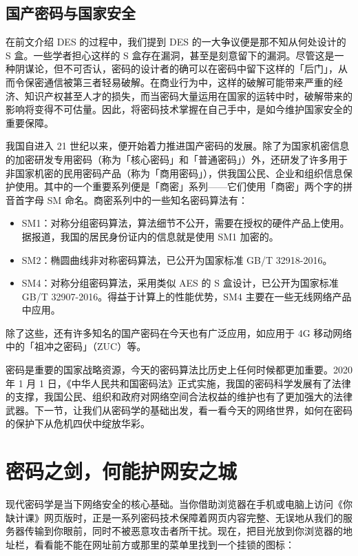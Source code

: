 \subsection{国产密码与国家安全}

在前文介绍 DES 的过程中，我们提到 DES 的一大争议便是那不知从何处设计的 S 盒。一些学者担心这样的 S 盒存在漏洞，甚至是刻意留下的漏洞。尽管这是一种阴谋论，但不可否认，密码的设计者的确可以在密码中留下这样的「后门」，从而令保密通信被第三者轻易破解。在商业行为中，这样的破解可能带来严重的经济、知识产权甚至人才的损失，而当密码大量运用在国家的运转中时，破解带来的影响将变得不可估量。因此，将密码技术掌握在自己手中，是如今维护国家安全的重要保障。

我国自进入 21 世纪以来，便开始着力推进国产密码的发展。除了为国家机密信息的加密研发专用密码（称为「核心密码」和「普通密码」）外，还研发了许多用于非国家机密的民用密码产品（称为「商用密码」），供我国公民、企业和组织信息保护使用。其中的一个重要系列便是「商密」系列——它们使用「商密」两个字的拼音首字母 SM 命名。商密系列中的一些知名密码算法有：

\begin{itemize}
  \item SM1：对称分组密码算法，算法细节不公开，需要在授权的硬件产品上使用。据报道，我国的居民身份证内的信息就是使用 SM1 加密的。
  \item SM2：椭圆曲线非对称密码算法，已公开为国家标准 GB/T 32918-2016。
  \item SM4：对称分组密码算法，采用类似 AES 的 S 盒设计，已公开为国家标准 GB/T 32907-2016。得益于计算上的性能优势，SM4 主要在一些无线网络产品中应用。
\end{itemize}

除了这些，还有许多知名的国产密码在今天也有广泛应用，如应用于 4G 移动网络中的「祖冲之密码」（ZUC）等。

密码是重要的国家战略资源，今天的密码算法比历史上任何时候都更加重要。2020 年 1 月 1 日，《中华人民共和国密码法》正式实施，我国的密码科学发展有了法律的支撑，我国公民、组织和政府对网络空间合法权益的维护也有了更加强大的法律武器。下一节，让我们从密码学的基础出发，看一看今天的网络世界，如何在密码的保护下从危机四伏中绽放华彩。

\section{密码之剑，何能护网安之城}

现代密码学是当下网络安全的核心基础。当你借助浏览器在手机或电脑上访问《你缺计课》网页版时，正是一系列密码技术保障着网页内容完整、无误地从我们的服务器传输到你眼前，同时不被恶意攻击者所干扰。现在，把目光放到你浏览器的地址栏，看看能不能在网址前方或那里的菜单里找到一个挂锁的图标：


